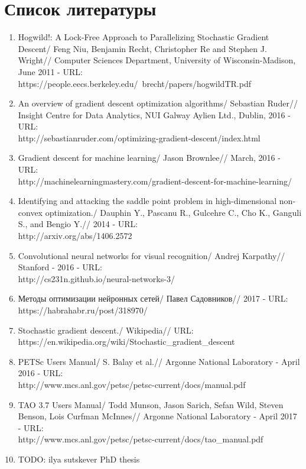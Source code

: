 \documentclass[12pt]{report}
\begin{document}
  \chapter{Список литературы}
  \begin{enumerate}
    \item
    Hogwild!: A Lock-Free Approach to Parallelizing Stochastic Gradient Descent/
    Feng Niu, Benjamin Recht, Christopher Re and Stephen J. Wright//
    Computer Sciences Department, University of Wisconsin-Madison, June 2011 - URL:\\
    https://people.eecs.berkeley.edu/~brecht/papers/hogwildTR.pdf
    \item
    An overview of gradient descent optimization algorithms/
    Sebastian Ruder//
    Insight Centre for Data Analytics, NUI Galway Aylien Ltd., Dublin, 2016 - URL:\\
    http://sebastianruder.com/optimizing-gradient-descent/index.html
    \item
    Gradient descent for machine learning/
    Jason Brownlee//
    March, 2016 - URL:\\
    http://machinelearningmastery.com/gradient-descent-for-machine-learning/
    \item
    Identifying and attacking the saddle point problem in high-dimensional
    non-convex optimization./
    Dauphin Y., Pascanu R., Gulcehre C., Cho K., Ganguli S., and Bengio Y.//
    2014 - URL:\\
    http://arxiv.org/abs/1406.2572
    \item
    Convolutional neural networks for visual recognition/
    Andrej Karpathy//
    Stanford - 2016 - URL:\\
    http://cs231n.github.io/neural-networks-3/
    \item
    Методы оптимизации нейронных сетей/
    Павел Садовников//
    2017 - URL:\\
    https://habrahabr.ru/post/318970/
    \item
    Stochastic gradient descent./
    Wikipedia//
    URL:\\
    https://en.wikipedia.org/wiki/Stochastic\_gradient\_descent
    \item
    PETSc Users Manual/
    S. Balay et al.//
    Argonne National Laboratory - April 2016 - URL:\\
    http://www.mcs.anl.gov/petsc/petsc-current/docs/manual.pdf
    \item
    TAO 3.7 Users Manual/
    Todd Munson, Jason Sarich, Sefan Wild, Steven Benson, Lois Curfman McInnes//
    Argonne National Laboratory - April 2017 - URL:\\
    http://www.mcs.anl.gov/petsc/petsc-current/docs/tao\_manual.pdf
    \item
    {TODO: ilya sutskever PhD thesis}
  \end{enumerate}
\end{document}
